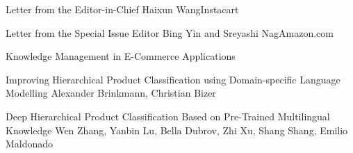 \documentclass[11pt]{article}
\begin{document}


\begin{bulletin}


%
%

\begin{lettersection}


\begin{letter}{Letter from the Editor-in-Chief}
{Haixun Wang}{Instacart}

\end{letter}
%
\newpage
%
%
\begin{letter}{Letter from the Special Issue Editor} 
{Bing Yin and Sreyashi Nag}{Amazon.com}


\end{letter}
\end{lettersection}

\begin{articlesection}{Knowledge Management in E-Commerce Applications}

\begin{article}
{Improving Hierarchical Product Classification using Domain-specific Language Modelling}
{Alexander Brinkmann, Christian Bizer}

\end{article}

\begin{article}
{Deep Hierarchical Product Classification Based on Pre-Trained Multilingual Knowledge}
{Wen Zhang, Yanbin Lu, Bella Dubrov, Zhi Xu, Shang Shang, Emilio Maldonado}

\end{article}


\end{articlesection}
\end{bulletin}
\end{document}
